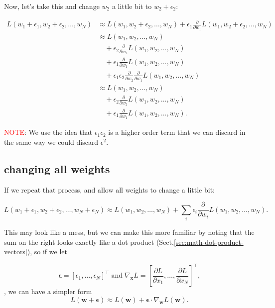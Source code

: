 Now, let's take this and change $w_2$ a little bit to $w_2 + \epsilon_2$:

$$
\begin{aligned}
L(w_1+\epsilon_1, w_2+\epsilon_2, \ldots, w_N) & \approx L(w_1, w_2+\epsilon_2, \ldots, w_N) + \epsilon_1 \frac{\partial}{\partial w_1} L(w_1, w_2+\epsilon_2, \ldots, w_N) \\
& \approx L(w_1, w_2, \ldots, w_N) \\
& \quad + \epsilon_2\frac{\partial}{\partial w_2} L(w_1, w_2, \ldots, w_N) \\
& \quad + \epsilon_1 \frac{\partial}{\partial w_1} L(w_1, w_2, \ldots, w_N) \\
& \quad + \epsilon_1\epsilon_2\frac{\partial}{\partial w_2}\frac{\partial}{\partial w_1} L(w_1, w_2, \ldots, w_N) \\
& \approx L(w_1, w_2, \ldots, w_N) \\
& \quad + \epsilon_2\frac{\partial}{\partial w_2} L(w_1, w_2, \ldots, w_N) \\
& \quad + \epsilon_1 \frac{\partial}{\partial w_1} L(w_1, w_2, \ldots, w_N).
\end{aligned}
$$

\textcolor{red}{NOTE}: We use the idea that $\epsilon_1\epsilon_2$ is a higher
order term that we can discard in the same way we could discard $\epsilon^{2}$.

\subsection{changing all weights}

If we repeat that process, and allow all weights to change a little bit:

$$
L(w_1+\epsilon_1, w_2+\epsilon_2, \ldots, w_N+\epsilon_N) \approx L(w_1, w_2, \ldots, w_N) + \sum_i \epsilon_i \frac{\partial}{\partial w_i} L(w_1, w_2, \ldots, w_N).
$$

This may look like a mess, but we can make this more familiar by noting that the
sum on the right looks exactly like a dot product
(Sect.\ref{sec:math-dot-product-vectors}), so if we let

$$
\boldsymbol{\epsilon} = [\epsilon_1, \ldots, \epsilon_N]^\top \; \text{and} \;
\nabla_{\mathbf{x}} L = \left[\frac{\partial L}{\partial x_1}, \ldots, \frac{\partial L}{\partial x_N}\right]^\top,
$$
, we can have a simpler form
\begin{equation}
L(\mathbf{w} + \boldsymbol{\epsilon}) \approx L(\mathbf{w}) + \boldsymbol{\epsilon}\cdot \nabla_{\mathbf{w}} L(\mathbf{w}).
\end{equation}

